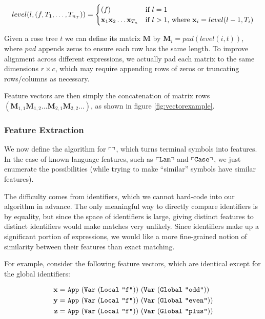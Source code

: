 \begin{equation*}
  level(l, (f, T_1, \dots, T_{n_T})) =
    \begin{cases}
      (f) & \text{if $l = 1$} \\
      \mathbf{x}_1 \mathbf{x}_2 \dots \mathbf{x}_{T_n} & \text{if $l > 1$, where $\mathbf{x}_i = level(l - 1, T_i)$}
    \end{cases}
\end{equation*}

Given a rose tree $t$ we can define its matrix $\mathbf{M}$ by $\mathbf{M}_i = pad(level(i, t))$, where $pad$ appends zeros to ensure each row has the same length. To improve alignment across different expressions, we actually pad each matrix to the same dimensions $r \times c$, which may require appending rows of zeros or truncating rows/columns as necessary.

Feature vectors are then simply the concatenation of matrix rows $(\mathbf{M}_{1,1} \mathbf{M}_{1,2} \dots \mathbf{M}_{2,1} \mathbf{M}_{2,2} \dots)$, as shown in figure \ref{fig:vectorexample}.

\subsubsection{Feature Extraction}

We now define the algorithm for $\left\ulcorner  \right\urcorner$, which turns terminal symbols into features. In the case of known language features, such as $\left\ulcorner \texttt{Lam} \right\urcorner$ and $\left\ulcorner \texttt{Case} \right\urcorner$, we just enumerate the possibilities (while trying to make ``similar'' symbols have similar features).

The difficulty comes from identifiers, which we cannot hard-code into our algorithm in advance. The only meaningful way to directly compare identifiers is by equality, but since the space of identifiers is large, giving distinct features to distinct identifiers would make matches very unlikely. Since identifiers make up a significant portion of expressions, we would like a more fine-grained notion of similarity between their features than exact matching.

For example, consider the following feature vectors, which are identical except for the global identifiers:

\begin{equation*}
  \begin{split}
    \vect{x} =\ & \texttt{App}\ (\texttt{Var}\ (\texttt{Local}\ \texttt{"f"}))\ (\texttt{Var}\ (\texttt{Global}\ \texttt{"odd"})) \\
    \vect{y} =\ & \texttt{App}\ (\texttt{Var}\ (\texttt{Local}\ \texttt{"f"}))\ (\texttt{Var}\ (\texttt{Global}\ \texttt{"even"})) \\
    \vect{z} =\ & \texttt{App}\ (\texttt{Var}\ (\texttt{Local}\ \texttt{"f"}))\ (\texttt{Var}\ (\texttt{Global}\ \texttt{"plus"}))
  \end{split}
\end{equation*}

